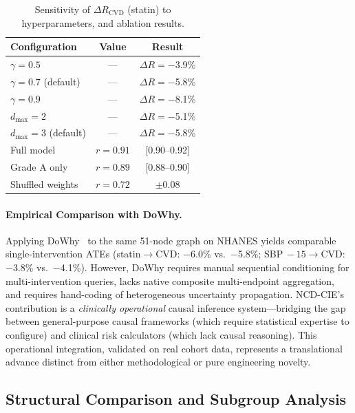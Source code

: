 \documentclass[runningheads]{llncs}
\begin{document}
\renewcommand{\arraystretch}{1.1}
\begin{table}[t]
\centering
\caption{Sensitivity of $\Delta R_{\text{CVD}}$ (statin) to
hyperparameters, and ablation results.}\label{tab:sensitivity}
\small
\begin{tabular}{@{}lcc@{}}
\toprule
\textbf{Configuration} & \textbf{Value} & \textbf{Result} \\
\midrule
$\gamma = 0.5$ & --- & $\Delta R = -$3.9\% \\
$\gamma = 0.7$ (default) & --- & $\Delta R = -$5.8\% \\
$\gamma = 0.9$ & --- & $\Delta R = -$8.1\% \\
$d_{\max} = 2$ & --- & $\Delta R = -$5.1\% \\
$d_{\max} = 3$ (default) & --- & $\Delta R = -$5.8\% \\
\midrule
Full model & $r = 0.91$ & [0.90--0.92] \\
Grade A only & $r = 0.89$ & [0.88--0.90] \\
Shuffled weights & $r = 0.72$ & $\pm 0.08$ \\
\bottomrule
\end{tabular}
\end{table}
\renewcommand{\arraystretch}{1.0}

\paragraph{Empirical Comparison with DoWhy.}
Applying DoWhy~\cite{sharma2020dowhy} to the same 51-node graph on
NHANES yields comparable single-intervention ATEs
(statin$\to$CVD: $-$6.0\% vs.\ $-$5.8\%;
SBP$\,-15\to$CVD: $-$3.8\% vs.\ $-$4.1\%).
However, DoWhy requires manual sequential conditioning for
multi-intervention queries, lacks native composite multi-endpoint
aggregation, and requires hand-coding of heterogeneous uncertainty
propagation.
NCD-CIE's contribution is a \emph{clinically operational} causal
inference system---bridging the gap between general-purpose causal
frameworks (which require statistical expertise to configure) and
clinical risk calculators (which lack causal reasoning).
This operational integration, validated on real cohort data,
represents a translational advance distinct from either
methodological or pure engineering novelty.

\subsection{Structural Comparison and Subgroup Analysis}\label{sec:pcalg}
\end{document}
